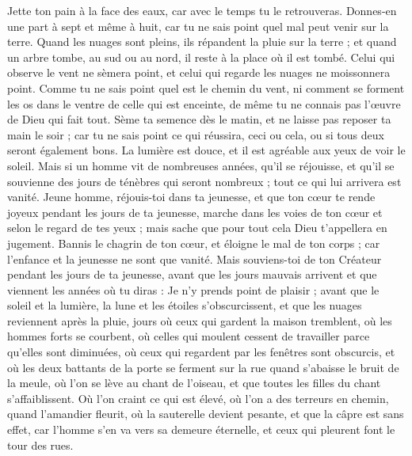 \begin{multicols}{2}
\VerseOne{}Jette ton pain à la face des eaux, car avec le temps tu le retrouveras.
Donnes-en une part à sept et même à huit, car tu ne sais point quel mal peut venir sur la terre.
Quand les nuages sont pleins, ils répandent la pluie sur la terre ; et quand un arbre tombe, au sud ou au nord, il reste à la place où il est tombé.
Celui qui observe le vent ne sèmera point, et celui qui regarde les nuages ne moissonnera point.
Comme tu ne sais point quel est le chemin du vent, ni comment se forment les os dans le ventre de celle qui est enceinte, de même tu ne connais pas l'œuvre de Dieu qui fait tout.
Sème ta semence dès le matin, et ne laisse pas reposer ta main le soir ; car tu ne sais point ce qui réussira, ceci ou cela, ou si tous deux seront également bons.
La lumière est douce, et il est agréable aux yeux de voir le soleil.
Mais si un homme vit de nombreuses années, qu'il se réjouisse, et qu'il se souvienne des jours de ténèbres qui seront nombreux ; tout ce qui lui arrivera est vanité.
\VerseOne{}Jeune homme, réjouis-toi dans ta jeunesse, et que ton cœur te rende joyeux pendant les jours de ta jeunesse, marche dans les voies de ton cœur et selon le regard de tes yeux ; mais sache que pour tout cela Dieu t'appellera en jugement.
Bannis le chagrin de ton cœur, et éloigne le mal de ton corps ; car l'enfance et la jeunesse ne sont que vanité.
Mais souviens-toi de ton Créateur pendant les jours de ta jeunesse, avant que les jours mauvais arrivent et que viennent les années où tu diras : Je n'y prends point de plaisir ;
avant que le soleil et la lumière, la lune et les étoiles s'obscurcissent, et que les nuages reviennent après la pluie,
jours où ceux qui gardent la maison tremblent, où les hommes forts se courbent, où celles qui moulent cessent de travailler parce qu'elles sont diminuées, où ceux qui regardent par les fenêtres sont obscurcis,
et où les deux battants de la porte se ferment sur la rue quand s'abaisse le bruit de la meule, où l'on se lève au chant de l'oiseau, et que toutes les filles du chant s'affaiblissent.
Où l'on craint ce qui est élevé, où l'on a des terreurs en chemin, quand l'amandier fleurit, où la sauterelle devient pesante, et que la câpre est sans effet, car l'homme s'en va vers sa demeure éternelle, et ceux qui pleurent font le tour des rues.

\end{multicols}
